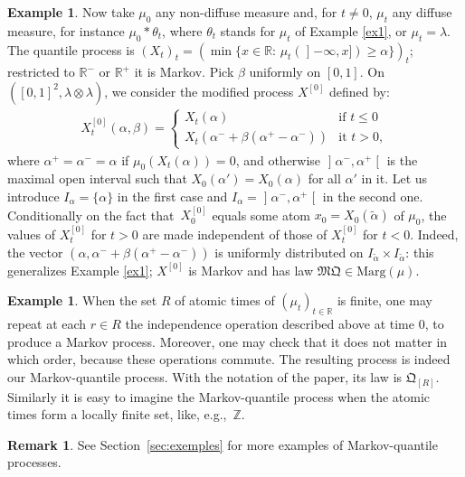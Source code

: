 \documentclass[JEP,XML,SOM,Unicode,NoEqCountersInSection,NoFloatCountersInSection,published]{cedram}
\theoremstyle{plain}
\theoremstyle{definition}
\newtheorem{rem}[them]{Remark}
\newtheorem{ex}[them]{Example}
\newcommand{\como}{\mathfrak{Q}}
\newcommand{\mq}{\mathfrak{MQ}}
\newcommand{\la}{\lambda}
\newcommand{\ma}{\mathrm{Marg}}
\newcommand{\R}{\mathbb{R}}
\newcommand{\op}{\mathopen}
\newcommand{\clo}{\mathclose}
\begin{document}
\begin{ex}\label{ex2}Now take $\mu_0$ any non-diffuse measure and, for $t\neq 0$, $\mu_t$ any diffuse measure, for instance $\mu_0\ast \theta_t$, where $\theta_t$ stands for $\mu_t$ of Example \ref{ex1}, or $\mu_t=\la$. The quantile process is $(X_t)_t=(\min\{x\in \R:\,\mu_t(\op]-\infty,x])\geq \alpha\})_t$; restricted to $\R^-$ or $\R^+$ it is Markov. Pick $\beta$ uniformly on $[0,1]$. On $([0,1]^2,\la\otimes \la)$, we consider the modified process $X^{[0]}$ defined by:
\begin{align*}
X_t^{[0]}(\alpha,\beta)=
\begin{cases}
X_t(\alpha)&\text{if }t\leq 0\\
X_t(\alpha^-+\beta(\alpha^+-\alpha^-))&\text{it }t>0,
\end{cases}
\end{align*}
where $\alpha^+=\alpha^-=\alpha$ if $\mu_0(X_t(\alpha))=0$, and otherwise $\op]\alpha^-,\alpha^+\clo[$ is the maximal open interval such that $X_0(\alpha')=X_0(\alpha)$ for all $\alpha'$ in it. Let us introduce $I_\alpha=\{\alpha\}$ in the first case and $I_\alpha=\op]\alpha^-,\alpha^+\clo[$ in the second one. Conditionally on the fact that~$X_0^{[0]}$ equals some atom $x_0=X_0(\tilde\alpha)$ of $\mu_0$, the values of $X^{[0]}_t$ for $t>0$ are made independent of those of $X^{[0]}_t$ for $t<0$. Indeed, the vector $(\alpha,\alpha^- +\beta(\alpha^+-\alpha^-))$ is uniformly distributed on $I_{\tilde\alpha}\times I_{\tilde\alpha}$: this generalizes Example \ref{ex1}; $X^{[0]}$ is Markov and has law\/ $\mq\in \ma(\mu)$.
\end{ex}

\begin{ex}When the set $R$ of atomic times of $(\mu_t)_{t\in \R}$ is finite, one may repeat at each $r\in R$ the independence operation described above at time $0$, to produce a Markov process. Moreover, one may check that it does not matter in which order, \hbox{because} these operations commute. The resulting process is indeed our Markov-quantile process. With the notation of the paper, its law is $\como_{[R]}$. Similarly it is easy to imagine the Markov-quantile process when the atomic times form a locally finite set, like, e.g.,~$\mathbb{Z}$.
\end{ex}

\begin{rem} See Section~\ref{sec:exemples} for more examples of Markov-quantile processes.
\end{rem}
\end{document}
